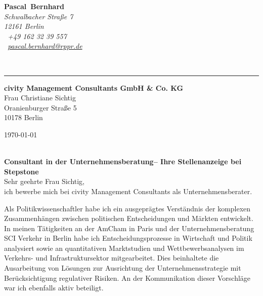 \documentclass[11pt,a4paper]{article}
\def\firstname{Pascal}
\def\familyname{Bernhard}
\begin{document}
\sffamily   %
\hfill%
\begin{minipage}[t]{.6\textwidth}
	\raggedleft%
	{\bfseries {\color{firstnamecolor}\firstname}~{\color{familynamecolor}\familyname}}\\[.35ex]
	\small\itshape%
	Schwalbacher Straße 7\\
	12161 Berlin\\[.35ex]
	\Mobilefone~+49 162 32 39 557 \\
	\Letter~\href{mailto:pascal.bernhard@rppr.de}{pascal.bernhard@rppr.de}
\end{minipage}\\[0.5em]
%
{\color{firstnamecolor}\rule{\textwidth}{.25ex}}
%
\begin{minipage}[t]{.4\textwidth}
	\raggedright%
	\vspace*{1em}
	\textbf{civity Management Consultants GmbH \& Co. KG} \\
	Frau Christiane Sichtig \\[.35ex]
	\small%
	Oranienburger Straße 5\\
	10178 Berlin
\end{minipage}
%
\hfill
%
\begin{minipage}[t]{.4\textwidth}
	\raggedleft %
	\today
\end{minipage}\\[1em]


{\bfseries \color{familynamecolor}Consultant in der Unternehmensberatung-- Ihre Stellenanzeige bei Stepstone}\\[0.75em]

Sehr geehrte Frau Sichtig,\\[0.5em]
%
ich bewerbe mich bei civity Management Consultants als Unternehmensberater.

Als Politikwissenschaftler habe ich ein ausgeprägtes Verständnis der komplexen Zusammenhängen zwischen politischen Entscheidungen und Märkten entwickelt. In meinen Tätigkeiten an der AmCham in Paris und der Unternehmensberatung SCI Verkehr in Berlin habe ich Entscheidungsprozesse in Wirtschaft und Politik analysiert sowie an quantitativen Marktstudien und Wettbewerbsanalysen im Verkehrs- und Infrastruktursektor mitgearbeitet. Dies beinhaltete die Ausarbeitung von Lösungen zur Ausrichtung der Unternehmensstrategie mit Berücksichtigung regulativer Risiken. An der Kommunikation dieser Vorschläge war ich ebenfalls aktiv beteiligt.
\end{document}
